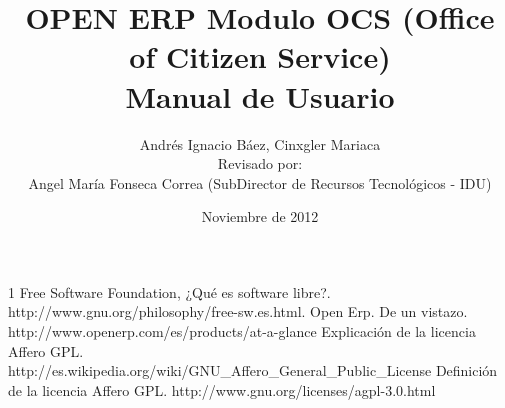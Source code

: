 \documentclass[letterpaper,12pt]{article}
\title{OPEN ERP Modulo OCS (Office of Citizen Service)\\Manual de Usuario}
\author{Andrés Ignacio Báez, Cinxgler Mariaca\\Revisado por: \\
Angel María Fonseca Correa (SubDirector de Recursos Tecnológicos - IDU)}
\date{Noviembre de 2012}
\begin{document}
\maketitle










\begin {thebibliography}{1} 
 Free Software Foundation, ¿Qué es software libre?. http://www.gnu.org/philosophy/free-sw.es.html.
 Open Erp. De un vistazo. http://www.openerp.com/es/products/at-a-glance
 Explicación de la licencia Affero GPL. \\http://es.wikipedia.org/wiki/GNU\_Affero\_General\_Public\_License 
 Definición de la licencia Affero GPL. http://www.gnu.org/licenses/agpl-3.0.html
\end {thebibliography}
\end{document}

